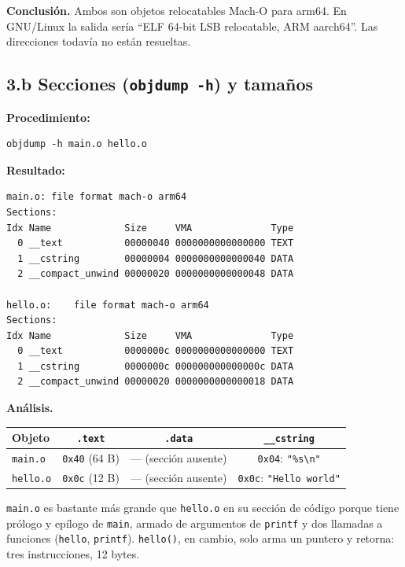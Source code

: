\documentclass[11pt,a4paper]{article}
\begin{document}
\textbf{Conclusión.} Ambos son objetos relocatables Mach-O para arm64.
En GNU/Linux la salida sería ``ELF 64-bit LSB relocatable, ARM
aarch64''. Las direcciones todavía no están resueltas.

\subsection*{3.b Secciones (\texttt{objdump -h}) y tamaños}

\textbf{Procedimiento:}

\begin{lstlisting}
objdump -h main.o hello.o
\end{lstlisting}

\textbf{Resultado:}

\begin{lstlisting}[style=asmstyle]
main.o:	file format mach-o arm64
Sections:
Idx Name             Size     VMA              Type
  0 __text           00000040 0000000000000000 TEXT
  1 __cstring        00000004 0000000000000040 DATA
  2 __compact_unwind 00000020 0000000000000048 DATA

hello.o:	file format mach-o arm64
Sections:
Idx Name             Size     VMA              Type
  0 __text           0000000c 0000000000000000 TEXT
  1 __cstring        0000000c 000000000000000c DATA
  2 __compact_unwind 00000020 0000000000000018 DATA
\end{lstlisting}

\textbf{Análisis.}

\begin{center}
\small
\begin{tabular}{l c c c}
\toprule
\textbf{Objeto} & \texttt{.text} & \texttt{.data} & \texttt{\_\_cstring} \\
\midrule
\texttt{main.o}  & \texttt{0x40} (64 B) & --- (sección ausente) & \texttt{0x04}: \texttt{"\%s\textbackslash n"} \\
\texttt{hello.o} & \texttt{0x0c} (12 B) & --- (sección ausente) & \texttt{0x0c}: \texttt{"Hello world"} \\
\bottomrule
\end{tabular}
\end{center}

\texttt{main.o} es bastante más grande que \texttt{hello.o} en su
sección de código porque tiene prólogo y epílogo de \texttt{main},
armado de argumentos de \texttt{printf} y dos llamadas a funciones
(\texttt{hello}, \texttt{printf}). \texttt{hello()}, en cambio, solo
arma un puntero y retorna: tres instrucciones, 12 bytes.
\end{document}
